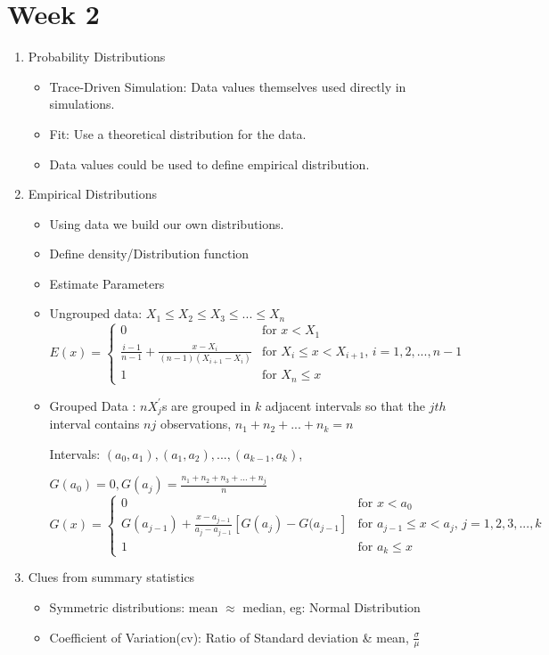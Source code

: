 \documentclass[a4paper]{article}
\begin{document}
\section{Week 2}
	\begin{enumerate}
		\item Probability Distributions
		\begin{itemize}
			\item Trace-Driven Simulation: Data values themselves used directly in simulations.
			\item Fit: Use a theoretical distribution for the data.
			\item Data values could be used to define empirical distribution.  
		\end{itemize}
		\item Empirical Distributions
		\begin{itemize}
			\item Using data we build our own distributions.
			\item Define density/Distribution function
			\item Estimate Parameters
			\item Ungrouped data: $X_1 \leq X_2 \leq X_3 \leq ... \leq X_n$
			\[
			E(x) = 
			\begin{cases}
				0&\text{for $x < X_1$}\\
				\frac{i - 1}{n - 1} + \frac{x - X_i}{(n - 1)(X_{i+1} - X_i)}&\text{for $X_i \leq x < X_{i+1}$, $i = 1,2,...,n-1$}\\
				1&\text{for $X_n \leq x$}
			\end{cases}				
			\]
			\item Grouped Data : $n X_j^{'}$s are grouped in $k$ adjacent intervals so that the $jth$ interval contains $nj$ observations, $n_1 + n_2 + ... + n_k = n$
			
			Intervals: $(a_0, a_1), (a_1, a_2), ..., (a_{k-1}, a_k)$, 
			
			$G(a_0) = 0, G(a_j) = \frac{n_1 + n_2 + n_3 + ... + n_j}{n}$
			\[
			G(x) = 
			\begin{cases}
			0&\text{for $x < a_0$}\\
			G(a_{j-1}) + \frac{x-a_{j-1}}{a_j-a_{j-1}}[G(a_j) - G(a_{j-1}]&\text{for $a_{j-1} \leq x < a_j$, $j = 1,2,3,...,k$}\\
			1&\text{for $a_k \leq x$}
			\end{cases}
			\] 
		\end{itemize}
		\item Clues from summary statistics
		\begin{itemize}
			\item Symmetric distributions: mean $\approx$ median, eg: Normal Distribution
			\item Coefficient of Variation(cv): Ratio of Standard deviation \& mean, $\frac{\sigma}{\mu}$
			

\end{itemize}
\end{enumerate}
\end{document}
